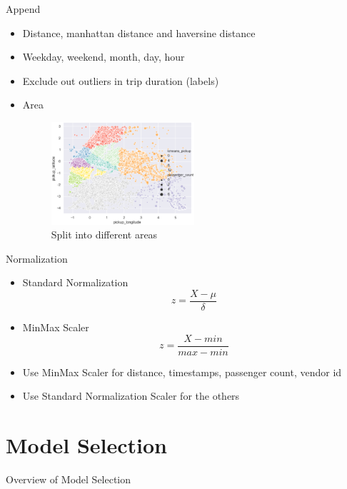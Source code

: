 \documentclass[
 size=12pt,
 paper=smartboard, %
 mode=present, %
 display=slides, %
style=tuliplab,
pauseslide,
fleqn,leqno]{powerdot}
\begin{document}
\begin{slide}{Append}
  \begin{itemize}
    \item Distance, manhattan distance and haversine distance \pause
    \item Weekday, weekend, month, day, hour \pause
    \item Exclude out outliers in trip duration (labels) \pause
    \item Area
    \begin{figure}[h]
      \centering
      \includegraphics[width=0.5\textwidth]{figures2/area.eps}
      \caption{Split into different areas}
      \label{fig:area-geo}
    \end{figure}
  \end{itemize}
\end{slide}


\begin{slide}{Normalization}
  \begin{itemize}
    \item Standard Normalization 
    $$
    z = \frac{X-\mu}{\delta}
    $$
    \pause
    \item MinMax Scaler
    $$
    z = \frac{X-min}{max-min}
    $$
    \pause
    \item Use MinMax Scaler for distance, timestamps, passenger count, vendor id \pause
    \item Use Standard Normalization Scaler for the others \pause
  \end{itemize}
\end{slide}


\section{Model Selection}

\begin{slide}[toc=,bm=]{Overview of Model Selection}
  \tableofcontents[content=currentsection,type=0]
\end{slide}
\end{document}
